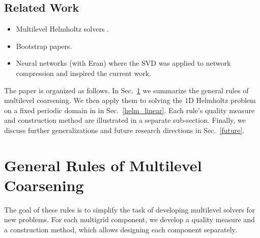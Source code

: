 \documentclass{article}
\begin{document}
\subsection{Related Work}
{\bf
\begin{itemize}
    \item Multilevel Helmholtz solvers \cite{wave_ray, later_papers}.
    \item Bootstrap papers.
    \item Neural networks (with Eran) where the SVD was applied to network compression and inspired the current work.
\end{itemize}
}

The paper is organized as follows. In Sec.~\ref{rules} we summarize the general rules of multilevel coarsening. We then apply them to solving the 1D Helmholtz problem on a fixed periodic domain in in Sec.~\ref{helm_linear}. Each rule's quality measure and construction method are illustrated in a separate sub-section. Finally, we discuss further generalizations and future research directions in Sec.~\ref{future}.

\section{General Rules of Multilevel Coarsening}
\label{rules}
The goal of these rules is to simplify the task of developing multilevel solvers for new problems. For each multigrid component, we develop a quality measure and a construction method, which allows designing each component separately.

\end{document}
